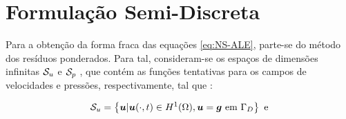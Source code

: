 % 
% 

\section{Formulação Semi-Discreta} \label{FSD}

Para a obtenção da forma fraca das equações \eqref{eq:NS-ALE}, parte-se do método dos resíduos ponderados. Para tal, consideram-se os espaços de dimensões infinitas $\mathcal{S}_u$ e $\mathcal{S}_p$ , que contém as funções tentativas para os campos de velocidades e pressões, respectivamente, tal que \cite{bazilevs2013computational,fernandes2020tecnica}:

\begin{equation}
    \mathcal{S}_u=\left\{\boldsymbol{u}|\boldsymbol{u}(\cdot,t)\in H^1(\Omega),\boldsymbol{u}=\boldsymbol{g}\text{ em }\Gamma_D\right\}\text{ e}
\end{equation}

